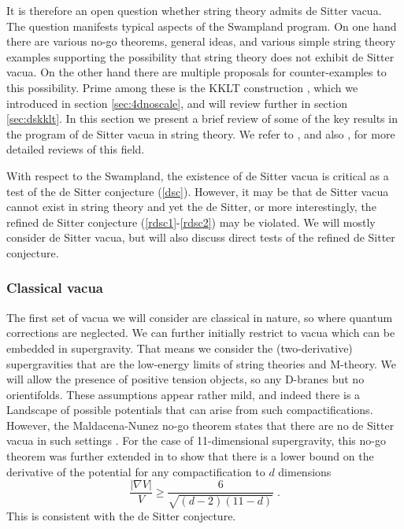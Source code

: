 \documentclass[11pt,a4paper]{article}
\numberwithin{equation}{section}
\numberwithin{table}{section}\setlength{\multlinegap}{25pt}
\newcommand{\be}{\begin{equation}}
\newcommand{\ee}{\end{equation}}
\begin{document}
{It is therefore an open question whether string theory admits de Sitter vacua. The question manifests typical aspects of the Swampland program. On one hand there are various no-go theorems, general ideas, and various simple string theory examples supporting the possibility that string theory does not exhibit de Sitter vacua. On the other hand there are multiple proposals for counter-examples to this possibility. Prime among these is the KKLT construction \cite{Kachru:2003aw}, which we introduced in section \ref{sec:4dnoscale}, and will review further in section \ref{sec:dskklt}. In this section we present a brief review of some of the key results in the program of de Sitter vacua in string theory. We refer to \cite{Danielsson:2018ztv}, and also \cite{Obied:2018sgi,Andriot:2018ept}, for more detailed reviews of this field.

With respect to the Swampland, the existence of de Sitter vacua is critical as a test of the de Sitter conjecture (\ref{dsc}). However, it may be that de Sitter vacua cannot exist in string theory and yet the de Sitter, or more interestingly, the refined de Sitter conjecture  (\ref{rdsc1}-\ref{rdsc2}) may be violated. We will mostly consider de Sitter vacua, but will also discuss direct tests of the refined de Sitter conjecture.

\subsubsection{Classical vacua}
\label{sec:classIIA}

The first set of vacua we will consider are classical in nature, so where quantum corrections are neglected. We can further initially restrict to vacua which can be embedded in supergravity. That means we consider the (two-derivative) supergravities that are the low-energy limits of string theories and M-theory. We will allow the presence of positive tension objects, so any D-branes but no orientifolds. These assumptions appear rather mild, and indeed there is a Landscape of possible potentials that can arise from such compactifications. However, the Maldacena-Nunez no-go theorem states that there are no de Sitter vacua in such settings \cite{Maldacena:2000mw}. For the case of 11-dimensional supergravity, this no-go theorem was further extended in \cite{Obied:2018sgi} to show that there is a lower bound on the derivative of the potential for any compactification to $d$ dimensions
\be
\frac{\left|\nabla V \right|}{V} \geq \frac{6}{\sqrt{\left(d-2\right)\left( 11-d\right)}}\;.
\ee
This is consistent with the de Sitter conjecture. 

}
\end{document}
